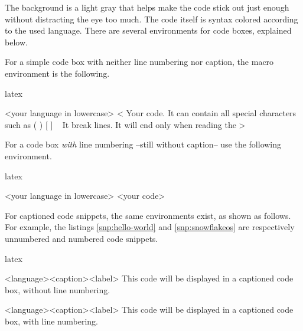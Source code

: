 \documentclass[raggedright, twoside, 11pt]{tufte-style-article}
\begin{document}
The background is a light gray that helps make the code stick out just enough without distracting the eye too much. The code itself is syntax colored according to the used language. There are several environments for code boxes, explained below.

For a simple code box with neither line numbering nor caption, the macro environment is the following.

%
\begin{altcodebox}{latex}
\begin{codebox}{<your language in lowercase>}
<
Your code. It can contain all special characters such as { } ( ) [ ] \ %
It break lines.
It will end only when reading the %
>
\end{codebox}
\end{altcodebox}

For a code box \textit{with} line numbering --still without caption-- use the following environment.
\begin{altcodebox}{latex}
\begin{codeboxnum}{<your language in lowercase>}
<your code>
\end{codeboxnum}
\end{altcodebox}

For captioned code snippets, the same environments exist, as shown as follows. For example, the listings \ref{snp:hello-world} and \ref{snp:snowflakeos} are respectively unnumbered and numbered code snippets.

\begin{codebox}{latex}
\begin{snippet}{<language>}{<caption>}{<label>}
This code will be displayed in a captioned code box, without line numbering.
\end{snippet}

\begin{snippetnum}{<language>}{<caption>}{<label>}
This code will be displayed in a captioned code box, with line numbering.
\end{snippetnum}	
\end{codebox}
\end{document}
